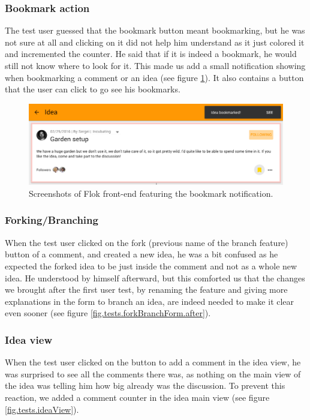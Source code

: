 \documentclass[a4paper,12pt,twoside]{article}
\begin{document}
\subsubsection*{Bookmark action}
The test user guessed that the bookmark button meant bookmarking, but he was not sure at all and clicking on it did not help him understand as it just colored it and incremented the counter.
He said that if it is indeed a bookmark, he would still not know where to look for it.
This made us add a small notification showing when bookmarking a comment or an idea (see figure \ref{fig.tests.bookmarkNotification}).
It also contains a button that the user can click to go see his bookmarks.

\begin{figure}[!htb]
    \centering
    \includegraphics[width=\textwidth]{images/user_tests/bookmarkNotification.png}
    \caption{Screenshots of Flok front-end featuring the bookmark notification.}
    \label{fig.tests.bookmarkNotification}
\end{figure}

\subsubsection*{Forking/Branching}
When the test user clicked on the fork (previous name of the branch feature) button of a comment, and created a new idea, he was a bit confused as he expected the forked idea to be just inside the comment and not as a whole new idea.
He understood by himself afterward, but this comforted us that the changes we brought after the first user test, by renaming the feature and giving more explanations in the form to branch an idea, are indeed needed to make it clear even sooner (see figure \ref{fig.tests.forkBranchForm.after}).

\subsubsection*{Idea view}
When the test user clicked on the button to add a comment in the idea view, he was surprised to see all the comments there was, as nothing on the main view of the idea was telling him how big already was the discussion.
To prevent this reaction, we added a comment counter in the idea main view (see figure \ref{fig.tests.ideaView}).
\end{document}
